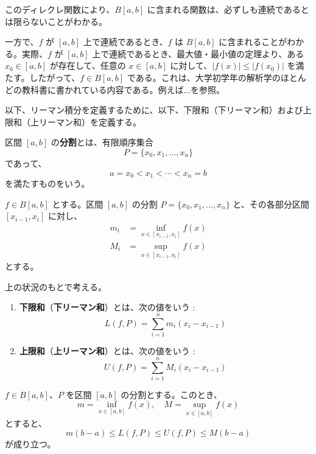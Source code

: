 \documentclass[article,paper=a4paper]{jlreq}
\begin{document}
\begin{rem}
このディレクレ関数により、$B[a,b]$ に含まれる関数は、必ずしも連続であるとは限らないことがわかる。

一方で、$f$ が $[a,b]$ 上で連続であるとき、$f$ は $B[a,b]$ に含まれることがわかる。実際、$f$ が $[a,b]$ 上で連続であるとき、最大値・最小値の定理より、ある $x_0 \in [a,b]$ が存在して、任意の $x \in [a,b]$ に対して、$\left\lvert f(x) \right\rvert \leq \left\lvert f(x_0) \right\rvert$ を満たす。したがって、$f \in B[a,b]$ である。これは、大学初学年の解析学のほとんどの教科書に書かれている内容である。例えば...を参照。
\end{rem}

以下、リーマン積分を定義するために、以下、下限和（下リーマン和）および上限和（上リーマン和）を定義する。

\begin{dfn}
区間 $[a,b]$ の\textbf{分割}とは、有限順序集合
\[P = \{x_0, x_1, \ldots, x_n\}\]
であって、
\[a = x_0 < x_1 < \cdots < x_n = b\]
を満たすものをいう。
\end{dfn}

\begin{dfn}
$f \in B[a,b]$ とする。区間 $[a,b]$ の分割 $P = \{x_0, x_1, \ldots, x_n\}$ と、その各部分区間 $[x_{i-1}, x_i]$ に対し、
\begin{align*}
    m_i &= \inf_{x \in [x_{i-1}, x_i]} f(x) \\
    M_i &= \sup_{x \in [x_{i-1}, x_i]} f(x)
\end{align*}
とする。
\end{dfn}

\begin{dfn}
    上の状況のもとで考える。
    \begin{enumerate}
        \item \textbf{下限和}（\textbf{下リーマン和}）とは、次の値をいう :
        \[L(f,P) = \sum_{i=1}^n m_i (x_i - x_{i-1})\]
        \item \textbf{上限和}（\textbf{上リーマン和}）とは、次の値をいう :
        \[U(f,P) = \sum_{i=1}^n M_i (x_i - x_{i-1})\]
    \end{enumerate}
\end{dfn}

\begin{prop}
$f \in B[a,b]$、$P$ を区間 $[a,b]$ の分割とする。このとき、
\[m = \inf_{x \in [a,b]}{f(x)}, \quad M = \sup_{x \in [a,b]}{f(x)}\]
とすると、
\[m(b-a) \leq L(f,P) \leq U(f,P) \leq M(b-a)\]
が成り立つ。
\end{prop}
\end{document}
